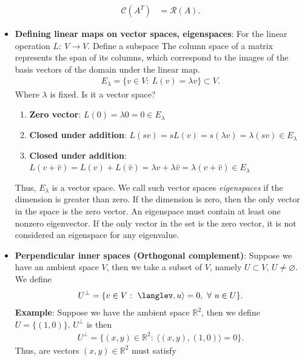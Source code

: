 \documentclass{report}
\begin{document}
\begin{itemize}
\begin{align*}
                \mathcal{C}(A^{T})&=\mathcal{R}(A)
            .\end{align*}
        \item \textbf{Defining linear maps on vector spaces, eigenspaces}: For the linear operation $L:\  V \to V$. Define a subspace 
            The column space of a matrix represents the span of its columns, which correspond to the images of the basis vectors of the domain under the linear map.
            \begin{align*}
                E_{\lambda} = \{v \in V :\ L(v) = \lambda v\} \subset V
            .\end{align*}
            Where $\lambda$ is fixed. Is it a vector space?
            \begin{enumerate}
                \item \textbf{Zero vector}: $L(0) = \lambda 0 = 0 \in E_{\lambda} $
                \item \textbf{Closed under addition}: $L(sv) = sL(v) = s(\lambda v ) = \lambda (sv) \in E_{\lambda}$
                \item \textbf{Closed under addition}: $L(v + \hat{v}) = L(v) + L(\hat{v}) = \lambda v + \lambda\hat{v} = \lambda(v + \hat{v}) \in E_{\lambda}$
            \end{enumerate}
            \bigbreak \noindent 
            Thus, $E_{\lambda}$ is a vector space. We call such vector spaces \textit{eigenspaces} if the dimension is greater than zero. If the dimension is zero, then the only vector in the space is the zero vector. An eigenspace must contain at least one nonzero eigenvector. If the only vector in the set is the zero vector, it is not considered an eigenspace for any eigenvalue.
        \item \textbf{Perpendicular inner spaces (Orthogonal complement)}: Suppose we have an ambient space $V$, then we take a subset of $V$, namely $U\subset V$, $U\ne \varnothing$. We define
            \begin{align*}
                U^{\perp} = \{v\in V :\ \langlev,u\rangle = 0, \ \forall \ u\in U\}
            .\end{align*}
            \bigbreak \noindent 
            \textbf{Example}: Suppose we have the ambient space $\mathbb{R}^{2}$, then we define $U = \{(1,0)\} $. $U^{\perp}$ is then
            \begin{align*}
                U^{\perp} = \{(x,y)\in \mathbb{R}^{2}:\ \langle(x,y), (1,0)\rangle = 0\}
            .\end{align*}
            Thus, are vectors $(x,y) \in \mathbb{R}^{2}$ must satisfy

\end{itemize}
\end{document}
